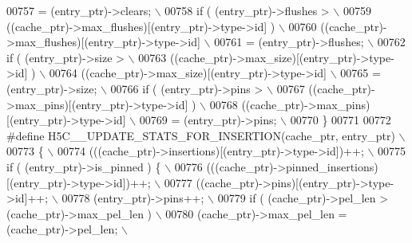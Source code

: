 \begin{DoxyCode}
00757 \textcolor{preprocessor}{                 = (entry\_ptr)->clears;                                  \(\backslash\)}
00758 \textcolor{preprocessor}{    if ( (entry\_ptr)->flushes >                                          \(\backslash\)}
00759 \textcolor{preprocessor}{            ((cache\_ptr)->max\_flushes)[(entry\_ptr)->type->id] )          \(\backslash\)}
00760 \textcolor{preprocessor}{        ((cache\_ptr)->max\_flushes)[(entry\_ptr)->type->id]                \(\backslash\)}
00761 \textcolor{preprocessor}{            = (entry\_ptr)->flushes;                                      \(\backslash\)}
00762 \textcolor{preprocessor}{    if ( (entry\_ptr)->size >                                             \(\backslash\)}
00763 \textcolor{preprocessor}{            ((cache\_ptr)->max\_size)[(entry\_ptr)->type->id] )             \(\backslash\)}
00764 \textcolor{preprocessor}{        ((cache\_ptr)->max\_size)[(entry\_ptr)->type->id]                   \(\backslash\)}
00765 \textcolor{preprocessor}{            = (entry\_ptr)->size;                                         \(\backslash\)}
00766 \textcolor{preprocessor}{    if ( (entry\_ptr)->pins >                                             \(\backslash\)}
00767 \textcolor{preprocessor}{            ((cache\_ptr)->max\_pins)[(entry\_ptr)->type->id] )             \(\backslash\)}
00768 \textcolor{preprocessor}{        ((cache\_ptr)->max\_pins)[(entry\_ptr)->type->id]                   \(\backslash\)}
00769 \textcolor{preprocessor}{            = (entry\_ptr)->pins;                                         \(\backslash\)}
00770 \textcolor{preprocessor}{\}}
00771 
00772 \textcolor{preprocessor}{#define H5C\_\_UPDATE\_STATS\_FOR\_INSERTION(cache\_ptr, entry\_ptr)        \(\backslash\)}
00773 \textcolor{preprocessor}{\{                                                                    \(\backslash\)}
00774 \textcolor{preprocessor}{    (((cache\_ptr)->insertions)[(entry\_ptr)->type->id])++;            \(\backslash\)}
00775 \textcolor{preprocessor}{    if ( (entry\_ptr)->is\_pinned ) \{                                  \(\backslash\)}
00776 \textcolor{preprocessor}{        (((cache\_ptr)->pinned\_insertions)[(entry\_ptr)->type->id])++; \(\backslash\)}
00777 \textcolor{preprocessor}{        ((cache\_ptr)->pins)[(entry\_ptr)->type->id]++;                \(\backslash\)}
00778 \textcolor{preprocessor}{        (entry\_ptr)->pins++;                                         \(\backslash\)}
00779 \textcolor{preprocessor}{        if ( (cache\_ptr)->pel\_len > (cache\_ptr)->max\_pel\_len )       \(\backslash\)}
00780 \textcolor{preprocessor}{            (cache\_ptr)->max\_pel\_len = (cache\_ptr)->pel\_len;         \(\backslash\)}

\end{DoxyCode}
